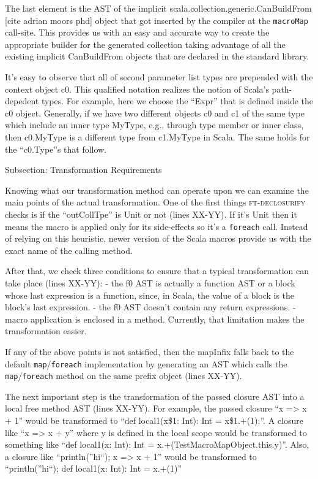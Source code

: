The last element is the AST of the implicit
scala.collection.generic.CanBuildFrom [cite adrian moors phd] object that got
inserted by the compiler at the \texttt{macroMap} call-site. This provides us with an
easy and accurate way to create the appropriate builder for the generated
collection taking advantage of all the existing implicit CanBuildFrom objects
that are declared in the standard library.

It's easy to observe that all of second parameter list types are prepended
with the context object c0. This qualified notation realizes the notion of
Scala's path-depedent types. For example, here we choose the ``Expr'' that is
defined inside the c0 object. Generally, if we have two different objects c0 and
c1 of the same type which include an inner type MyType, e.g., through type
member or inner class,  then c0.MyType is a different type from c1.MyType in
Scala. The same holds for the ``c0.Type''s that follow.


Subsection: Transformation Requirements

Knowing what our transformation method can operate upon we can examine the
main points of the actual transformation. One of the first things \textsc{ft-declosurify}
checks is if the ``outCollTpe'' is Unit or not (lines XX-YY). If it's Unit then
it means the macro is applied only for its side-effects so it's a \texttt{foreach} call.
Instead of relying on this heuristic, newer version of the Scala macros provide
us with the exact name of the calling method.

After that, we check three conditions to ensure that a typical
transformation can take place (lines XX-YY):
- the f0 AST is actually a function AST or a block whose last
expression is a function, since, in Scala, the value of a block is the block's
last expression.
- the f0 AST doesn't contain any return expressions.
- macro application is enclosed in a method. Currently, that limitation makes
the transformation easier.

If any of the above points is not satisfied, then the mapInfix falls back to the
default \texttt{map}/\texttt{foreach} implementation by generating an AST which
calls the \texttt{map}/\texttt{foreach} method on the same prefix object (lines XX-YY).

The next important step is the transformation of the passed closure AST
into a local free method AST (lines XX-YY). For example, the passed closure ``x
=> x + 1'' would be transformed to ``def local1(x\$1: Int): Int = x\$1.+(1);''. A
closure like ``x => x + y'' where y is defined in the local scope would be
transformed to something like ``def local1(x: Int): Int =
x.+(TestMacroMapObject.this.y)''. Also, a closure like ``{println(''hi``); x =>
x + 1}'' would be transformed to ``println(''hi``); def local1(x: Int): Int =
x.+(1)''

